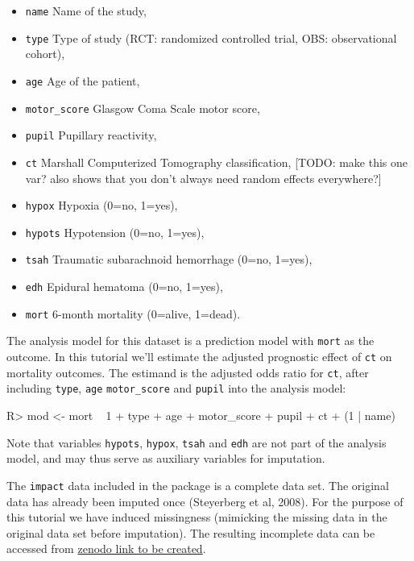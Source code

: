 \documentclass[
]{jss}
\providecommand{\tightlist}{%
  \setlength{\itemsep}{0pt}\setlength{\parskip}{0pt}}
\begin{document}
\begin{itemize}
\tightlist
\item
  \texttt{name} Name of the study,
\item
  \texttt{type} Type of study (RCT: randomized controlled trial, OBS:
  observational cohort),
\item
  \texttt{age} Age of the patient,
\item
  \texttt{motor\_score} Glasgow Coma Scale motor score,
\item
  \texttt{pupil} Pupillary reactivity,
\item
  \texttt{ct} Marshall Computerized Tomography classification, {[}TODO:
  make this one var? also shows that you don't always need random
  effects everywhere?{]}
\item
  \texttt{hypox} Hypoxia (0=no, 1=yes),
\item
  \texttt{hypots} Hypotension (0=no, 1=yes),
\item
  \texttt{tsah} Traumatic subarachnoid hemorrhage (0=no, 1=yes),
\item
  \texttt{edh} Epidural hematoma (0=no, 1=yes),
\item
  \texttt{mort} 6-month mortality (0=alive, 1=dead).
\end{itemize}

The analysis model for this dataset is a prediction model with
\texttt{mort} as the outcome. In this tutorial we'll estimate the
adjusted prognostic effect of \texttt{ct} on mortality outcomes. The
estimand is the adjusted odds ratio for \texttt{ct}, after including
\texttt{type}, \texttt{age} \texttt{motor\_score} and \texttt{pupil}
into the analysis model:

\begin{CodeChunk}
\begin{CodeInput}
R> mod <- mort ~ 1 + type + age + motor_score + pupil + ct + (1 | name) 
\end{CodeInput}
\end{CodeChunk}

Note that variables \texttt{hypots}, \texttt{hypox}, \texttt{tsah} and
\texttt{edh} are not part of the analysis model, and may thus serve as
auxiliary variables for imputation.

The \texttt{impact} data included in the  package is a
complete data set. The original data has already been imputed once
(Steyerberg et al, 2008). For the purpose of this tutorial we have
induced missingness (mimicking the missing data in the original data set
before imputation). The resulting incomplete data can be accessed from
\href{https://zenodo.com}{zenodo link to be created}.
\end{document}

